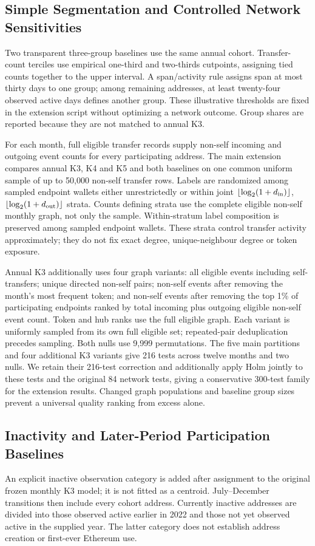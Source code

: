 \documentclass[journal,letterpaper]{IEEEtran}
\begin{document}
\subsection{Simple Segmentation and Controlled Network Sensitivities}
Two transparent three-group baselines use the same annual cohort. Transfer-count terciles use empirical one-third and two-thirds cutpoints, assigning tied counts together to the upper interval. A span/activity rule assigns span at most thirty days to one group; among remaining addresses, at least twenty-four observed active days defines another group. These illustrative thresholds are fixed in the extension script without optimizing a network outcome. Group shares are reported because they are not matched to annual K3.

For each month, full eligible transfer records supply non-self incoming and outgoing event counts for every participating address. The main extension compares annual K3, K4 and K5 and both baselines on one common uniform sample of up to 50,000 non-self transfer rows. Labels are randomized among sampled endpoint wallets either unrestrictedly or within joint $\lfloor\log_2(1+d_{\rm in})\rfloor$, $\lfloor\log_2(1+d_{\rm out})\rfloor$ strata. Counts defining strata use the complete eligible non-self monthly graph, not only the sample. Within-stratum label composition is preserved among sampled endpoint wallets. These strata control transfer activity approximately; they do not fix exact degree, unique-neighbour degree or token exposure.

Annual K3 additionally uses four graph variants: all eligible events including self-transfers; unique directed non-self pairs; non-self events after removing the month's most frequent token; and non-self events after removing the top 1\% of participating endpoints ranked by total incoming plus outgoing eligible non-self event count. Token and hub ranks use the full eligible graph. Each variant is uniformly sampled from its own full eligible set; repeated-pair deduplication precedes sampling. Both nulls use 9,999 permutations. The five main partitions and four additional K3 variants give 216 tests across twelve months and two nulls. We retain their 216-test correction and additionally apply Holm jointly to these tests and the original 84 network tests, giving a conservative 300-test family for the extension results. Changed graph populations and baseline group sizes prevent a universal quality ranking from excess alone.

\subsection{Inactivity and Later-Period Participation Baselines}
An explicit inactive observation category is added after assignment to the original frozen monthly K3 model; it is not fitted as a centroid. July--December transitions then include every cohort address. Currently inactive addresses are divided into those observed active earlier in 2022 and those not yet observed active in the supplied year. The latter category does not establish address creation or first-ever Ethereum use.
\end{document}

